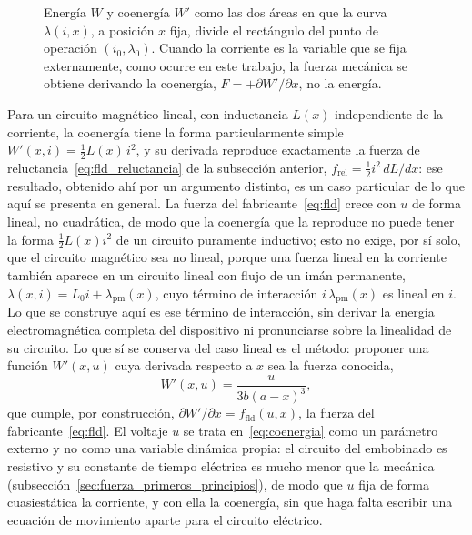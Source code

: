 \begin{figure}[ht]
    \centering
    
    \caption[Energía y coenergía magnética]{Energía $W$ y coenergía $W'$ como las dos áreas en que la curva $\lambda(i,x)$, a posición $x$ fija, divide el rectángulo del punto de operación $(i_0,\lambda_0)$. Cuando la corriente es la variable que se fija externamente, como ocurre en este trabajo, la fuerza mecánica se obtiene derivando la coenergía, $F=+\partial W'/\partial x$, no la energía.}
    \label{fig:energia_coenergia}
\end{figure}

Para un circuito magnético lineal, con inductancia $L(x)$ independiente de la corriente, la coenergía tiene la forma particularmente simple $W'(x,i)=\tfrac12 L(x)\,i^2$, y su derivada reproduce exactamente la fuerza de reluctancia~\eqref{eq:fld_reluctancia} de la subsección anterior, $f_{\text{rel}}=\tfrac12 i^2\,dL/dx$: ese resultado, obtenido ahí por un argumento distinto, es un caso particular de lo que aquí se presenta en general. La fuerza del fabricante~\eqref{eq:fld} crece con $u$ de forma lineal, no cuadrática, de modo que la coenergía que la reproduce no puede tener la forma $\tfrac12 L(x)i^2$ de un circuito puramente inductivo; esto no exige, por sí solo, que el circuito magnético sea no lineal, porque una fuerza lineal en la corriente también aparece en un circuito lineal con flujo de un imán permanente, $\lambda(x,i)=L_0 i+\lambda_{\text{pm}}(x)$, cuyo término de interacción $i\,\lambda_{\text{pm}}(x)$ es lineal en $i$. Lo que se construye aquí es ese término de interacción, sin derivar la energía electromagnética completa del dispositivo ni pronunciarse sobre la linealidad de su circuito. Lo que sí se conserva del caso lineal es el método: proponer una función $W'(x,u)$ cuya derivada respecto a $x$ sea la fuerza conocida,
\begin{equation}
W'(x,u) = \frac{u}{3b(a-x)^3} ,
\label{eq:coenergia}
\end{equation}
que cumple, por construcción, $\partial W'/\partial x = f_{\text{fld}}(u,x)$, la fuerza del fabricante~\eqref{eq:fld}. El voltaje $u$ se trata en~\eqref{eq:coenergia} como un parámetro externo y no como una variable dinámica propia: el circuito del embobinado es resistivo y su constante de tiempo eléctrica es mucho menor que la mecánica (subsección~\ref{sec:fuerza_primeros_principios}), de modo que $u$ fija de forma cuasiestática la corriente, y con ella la coenergía, sin que haga falta escribir una ecuación de movimiento aparte para el circuito eléctrico.

